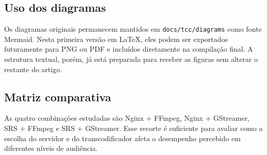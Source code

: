 \subsection{Uso dos diagramas}

Os diagramas originais permanecem mantidos em \texttt{docs/tcc/diagrams} como fonte Mermaid. Nesta primeira versão em LaTeX, eles podem ser exportados futuramente para PNG ou PDF e incluídos diretamente na compilação final. A estrutura textual, porém, já está preparada para receber as figuras sem alterar o restante do artigo.

\subsection{Matriz comparativa}

As quatro combinações estudadas são Nginx + FFmpeg, Nginx + GStreamer, SRS + FFmpeg e SRS + GStreamer. Esse recorte é suficiente para avaliar como a escolha do servidor e do transcodificador afeta o desempenho percebido em diferentes níveis de audiência.